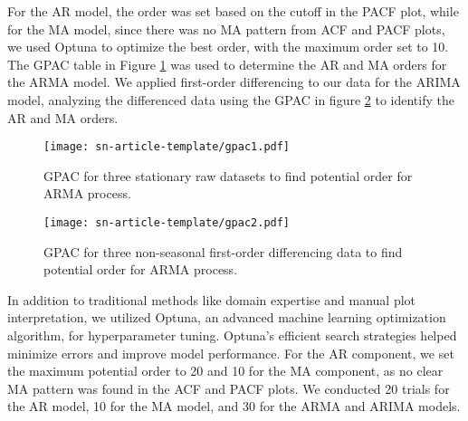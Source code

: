 \documentclass[sn-mathphys-num]{sn-jnl}
\theoremstyle{thmstyleone}%
\theoremstyle{thmstyletwo}%
\theoremstyle{thmstylethree}%
\begin{document}
For the AR model, the order was set based on the cutoff in the PACF plot, while for the MA model, since there was no MA pattern from ACF and PACF plots, we used Optuna to optimize the best order, with the maximum order set to 10. The GPAC table in Figure \ref{fig:gpac1}  was used to determine the AR and MA orders for the ARMA model. We applied first-order differencing to our data for the ARIMA model, analyzing the differenced data using the GPAC in figure \ref{fig:gpac2} to identify the AR and MA orders.
\begin{figure}[H]
	\begin{center}
		\texttt{[image: sn-article-template/gpac1.pdf]}
	\end{center}
	\caption{GPAC for three stationary raw datasets to find potential order for ARMA process.}
	\label{fig:gpac1}
\end{figure}

\begin{figure}[H]
	\begin{center}
		\texttt{[image: sn-article-template/gpac2.pdf]}
	\end{center}
	\caption{GPAC for three non-seasonal first-order differencing data to find potential order for ARMA process.}
	\label{fig:gpac2}
\end{figure}

In addition to traditional methods like domain expertise and manual plot interpretation, we utilized Optuna, an advanced machine learning optimization algorithm, for hyperparameter tuning. Optuna's efficient search strategies helped minimize errors and improve model performance. For the AR component, we set the maximum potential order to 20 and 10 for the MA component, as no clear MA pattern was found in the ACF and PACF plots. We conducted 20 trials for the AR model, 10 for the MA model, and 30 for the ARMA and ARIMA models.
\end{document}
